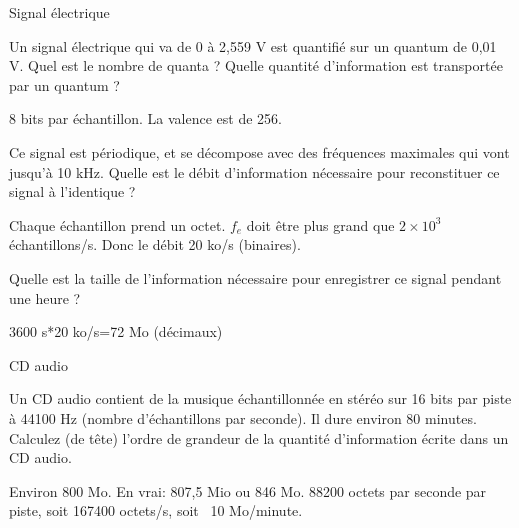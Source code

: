 \begin{exercice}
  \begin{exercicelet}{Signal électrique}
    \begin{questions}
    \item Un signal électrique qui va de 0 à 2,559 V est quantifié sur un
      quantum de 0,01 V. Quel est le nombre de quanta ? Quelle quantité
      d'information est transportée par un quantum ?
      \begin{xcorrection}
        8 bits par échantillon. La valence est de 256.
      \end{xcorrection}
    \item Ce signal est périodique, et se décompose avec des fréquences
      maximales qui vont jusqu'à 10 kHz. Quelle est le débit d'information
      nécessaire pour reconstituer ce signal à l'identique ?
      \begin{xcorrection}
        Chaque échantillon prend un octet. $f_e$ doit être plus grand que
        $2\times 10^3$ échantillons/s. Donc le débit 20 ko/s (binaires).
      \end{xcorrection}
    \item Quelle est la taille de l'information nécessaire pour enregistrer ce
      signal pendant une heure ?
      \begin{xcorrection}
        3600 s*20 ko/s=72 Mo (décimaux)
      \end{xcorrection}
    \end{questions}
  \end{exercicelet}
  \begin{exercicelet}{CD audio}
    \begin{questions}
    \item Un CD audio contient de la musique échantillonnée en stéréo sur 16
      bits par piste à 44100 Hz (nombre d'échantillons par seconde). Il dure
      environ 80 minutes. Calculez (de tête) l'ordre de grandeur de la
      quantité d'information écrite dans un CD audio.
      \begin{xcorrection}
        Environ 800 Mo. En vrai: 807,5 Mio ou 846 Mo.  88200 octets par
        seconde par piste, soit 167400 octets/s, soit ~10 Mo/minute.
      \end{xcorrection}
    \end{questions}
  \end{exercicelet}
\end{exercice}


